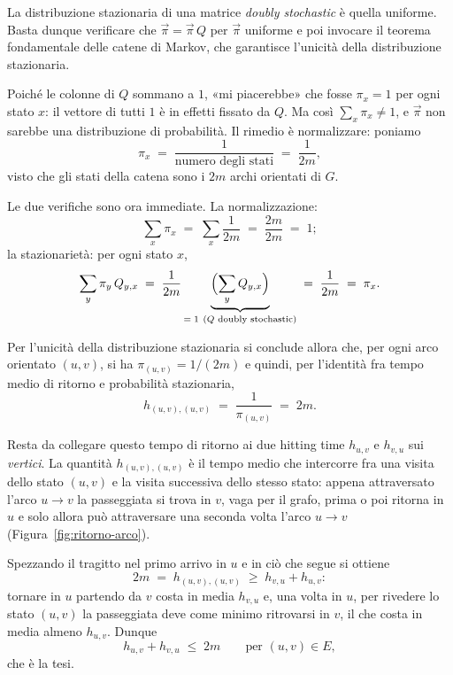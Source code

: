 \begin{dimostrazione}
  La distribuzione stazionaria di una matrice \emph{doubly stochastic} è quella uniforme.
  Basta dunque verificare che $\vec{\pi} = \vec{\pi}\,Q$ per $\vec{\pi}$ uniforme e poi
  invocare il teorema fondamentale delle catene di Markov, che garantisce l'unicità della
  distribuzione stazionaria.

  Poiché le colonne di $Q$ sommano a $1$, «mi piacerebbe» che fosse $\pi_x = 1$ per ogni
  stato $x$: il vettore di tutti $1$ è in effetti fissato da $Q$. Ma così
  $\sum_x \pi_x \neq 1$, e $\vec{\pi}$ non sarebbe una distribuzione di probabilità. Il rimedio
  è normalizzare: poniamo
  \[
    \pi_x \;=\; \frac{1}{\text{numero degli stati}} \;=\; \frac{1}{2m},
  \]
  visto che gli stati della catena sono i $2m$ archi orientati di $G$.

  Le due verifiche sono ora immediate. La normalizzazione:
  \[
    \sum_x \pi_x \;=\; \sum_x \frac{1}{2m} \;=\; \frac{2m}{2m} \;=\; 1 ;
  \]
  la stazionarietà: per ogni stato $x$,
  \[
    \sum_y \pi_y\, Q_{y,x}
    \;=\; \frac{1}{2m} \underbrace{\Bigl(\sum_y Q_{y,x}\Bigr)}_{=\;1\ (Q \text{ doubly stochastic})}
    \;=\; \frac{1}{2m}
    \;=\; \pi_x .
  \]

  Per l'unicità della distribuzione stazionaria si conclude allora che, per ogni arco
  orientato $(u,v)$, si ha $\pi_{(u,v)} = 1/(2m)$ e quindi, per l'identità fra tempo medio di
  ritorno e probabilità stazionaria,
  \[
    h_{(u,v),(u,v)} \;=\; \frac{1}{\pi_{(u,v)}} \;=\; 2m .
  \]

  Resta da collegare questo tempo di ritorno ai due hitting time $h_{u,v}$ e $h_{v,u}$ sui
  \emph{vertici}. La quantità $h_{(u,v),(u,v)}$ è il tempo medio che intercorre fra una visita
  dello stato $(u,v)$ e la visita successiva dello stesso stato: appena attraversato l'arco
  $u \to v$ la passeggiata si trova in $v$, vaga per il grafo, prima o poi ritorna in $u$ e
  solo allora può attraversare una seconda volta l'arco $u \to v$ (Figura~\ref{fig:ritorno-arco}).

  Spezzando il tragitto nel primo arrivo in $u$ e in ciò che segue si ottiene
  \[
    2m \;=\; h_{(u,v),(u,v)} \;\ge\; h_{v,u} + h_{u,v} :
  \]
  tornare in $u$ partendo da $v$ costa in media $h_{v,u}$ e, una volta in $u$, per rivedere
  lo stato $(u,v)$ la passeggiata deve come minimo ritrovarsi in $v$, il che costa in media
  almeno $h_{u,v}$. Dunque
  \[
    h_{u,v} + h_{v,u} \;\le\; 2m
    \qquad\text{per } (u,v) \in E ,
  \]
  che è la tesi.
\end{dimostrazione}


